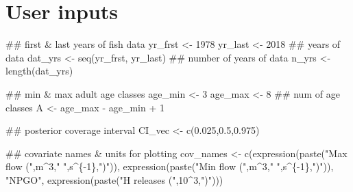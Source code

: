 \documentclass[
  11pt,
]{article}
\newenvironment{Shaded}{}{}
\newcommand{\DecValTok}[1]{#1}
\newcommand{\DocumentationTok}[1]{\textcolor[rgb]{0.00,0.50,0.00}{#1}}
\newcommand{\FloatTok}[1]{#1}
\newcommand{\FunctionTok}[1]{#1}
\newcommand{\NormalTok}[1]{#1}
\newcommand{\OtherTok}[1]{\textcolor[rgb]{1.00,0.25,0.00}{#1}}
\newcommand{\SpecialCharTok}[1]{\textcolor[rgb]{0.00,0.50,0.50}{#1}}
\newcommand{\StringTok}[1]{\textcolor[rgb]{0.00,0.50,0.50}{#1}}
\begin{document}
\hypertarget{user-inputs}{%
\section{User inputs}\label{user-inputs}}

\begin{Shaded}
\begin{Highlighting}[]
\DocumentationTok{\#\# first \& last years of fish data}
\NormalTok{yr\_frst }\OtherTok{\textless{}{-}} \DecValTok{1978}
\NormalTok{yr\_last }\OtherTok{\textless{}{-}} \DecValTok{2018}
\DocumentationTok{\#\# years of data}
\NormalTok{dat\_yrs }\OtherTok{\textless{}{-}} \FunctionTok{seq}\NormalTok{(yr\_frst, yr\_last)}
\DocumentationTok{\#\# number of years of data}
\NormalTok{n\_yrs }\OtherTok{\textless{}{-}} \FunctionTok{length}\NormalTok{(dat\_yrs)}

\DocumentationTok{\#\# min \& max adult age classes}
\NormalTok{age\_min }\OtherTok{\textless{}{-}} \DecValTok{3}
\NormalTok{age\_max }\OtherTok{\textless{}{-}} \DecValTok{8}
\DocumentationTok{\#\# num of age classes}
\NormalTok{A }\OtherTok{\textless{}{-}}\NormalTok{ age\_max }\SpecialCharTok{{-}}\NormalTok{ age\_min }\SpecialCharTok{+} \DecValTok{1}

\DocumentationTok{\#\# posterior coverage interval}
\NormalTok{CI\_vec }\OtherTok{\textless{}{-}} \FunctionTok{c}\NormalTok{(}\FloatTok{0.025}\NormalTok{,}\FloatTok{0.5}\NormalTok{,}\FloatTok{0.975}\NormalTok{)}

\DocumentationTok{\#\# covariate names \& units for plotting}
\NormalTok{cov\_names }\OtherTok{\textless{}{-}} \FunctionTok{c}\NormalTok{(}\FunctionTok{expression}\NormalTok{(}\FunctionTok{paste}\NormalTok{(}\StringTok{"Max flow ("}\NormalTok{,m}\SpecialCharTok{\^{}}\DecValTok{3}\NormalTok{,}\StringTok{" "}\NormalTok{,s}\SpecialCharTok{\^{}}\NormalTok{\{}\SpecialCharTok{{-}}\DecValTok{1}\NormalTok{\},}\StringTok{")"}\NormalTok{)),}
               \FunctionTok{expression}\NormalTok{(}\FunctionTok{paste}\NormalTok{(}\StringTok{"Min flow ("}\NormalTok{,m}\SpecialCharTok{\^{}}\DecValTok{3}\NormalTok{,}\StringTok{" "}\NormalTok{,s}\SpecialCharTok{\^{}}\NormalTok{\{}\SpecialCharTok{{-}}\DecValTok{1}\NormalTok{\},}\StringTok{")"}\NormalTok{)),}
               \StringTok{"NPGO"}\NormalTok{,}
               \FunctionTok{expression}\NormalTok{(}\FunctionTok{paste}\NormalTok{(}\StringTok{"H releases ("}\NormalTok{,}\DecValTok{10}\SpecialCharTok{\^{}}\DecValTok{3}\NormalTok{,}\StringTok{")"}\NormalTok{)))}
\end{Highlighting}
\end{Shaded}
\end{document}
